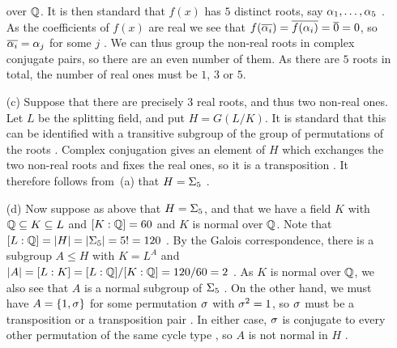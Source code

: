 \documentclass[a4paper]{article}
\begin{document}
\begin{solution}
\begin{itemize}
   over ${\mathbb{Q}}$.  It is then standard that $f(x)$ has $5$ distinct
   roots, say $\alpha_1,\dotsc,\alpha_5$ \mk.  As the coefficients of $f(x)$ are
   real we see that $f(\overline{\alpha_i})=\overline{f(\alpha_i)}=\overline{0}=0$, so
   $\overline{\alpha_i}=\alpha_j$ for some $j$ \mk.  We can thus group the non-real
   roots in complex conjugate pairs, so there are an even number of
   them.  As there are $5$ roots in total, the number of real ones
   must be $1$, $3$ or $5$. \mk
  \item[(c)] Suppose that there are precisely $3$ real roots, and thus
   two non-real ones.  Let $L$ be the splitting field, and put
   $H=G(L/K)$.  It is standard that this can be identified with a
   transitive subgroup of the group of permutations of the roots \mk.  
   Complex conjugation gives an element of $H$ which exchanges the two
   non-real roots and fixes the real ones, so it is a transposition \mk.
   It therefore follows from~(a) that $H=\Sigma_5$ \mk.
  \item[(d)] Now suppose as above that $H=\Sigma_5$, and that we have a
   field $K$ with ${\mathbb{Q}}\subseteq K\subseteq L$ and $[K:{\mathbb{Q}}]=60$ and $K$ is normal
   over ${\mathbb{Q}}$.  Note that $[L:{\mathbb{Q}}]=|H|=|\Sigma_5|=5!=120$ \mk.  By the Galois
   correspondence, there is a subgroup $A\leq H$ with $K=L^A$ \mk and
   $|A|=[L:K]=[L:{\mathbb{Q}}]/[K:{\mathbb{Q}}]=120/60=2$ \mk.  As $K$ is normal over ${\mathbb{Q}}$, we
   also see that $A$ is a normal subgroup of $\Sigma_5$ \mk.  On the other
   hand, we must have $A=\{1,\sigma\}$ for some permutation $\sigma$ with
   $\sigma^2=1$, so $\sigma$ must be a transposition or a transposition
   pair \mk.  In either case, $\sigma$ is conjugate to every other
   permutation of the same cycle type \mk, so $A$ is not normal in $H$ \mk.
 \end{itemize}
\end{solution}
\end{document}
